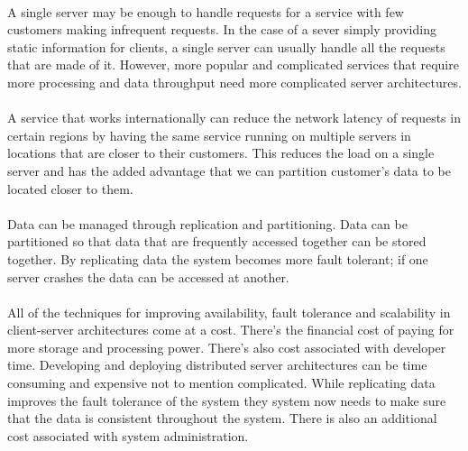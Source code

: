 \documentclass[11pt]{amsart}
\begin{document}
\paragraph{}
A single server may be enough to handle requests for a service with few customers making infrequent requests. In the case of a sever simply providing static information for clients, a single server can usually handle all the requests that are made of it. However, more popular and complicated services that require more processing and data throughput need more complicated server architectures.

\paragraph{}
 A service that works internationally can reduce the network latency of requests in certain regions by having the same service running on multiple servers in locations that are closer to their customers. This reduces the load on a single server and has the added advantage that we can partition customer's data to be located closer to them.

\paragraph{}
Data can be managed through replication and partitioning. Data can be partitioned so that data that are frequently accessed together can be stored together. By replicating data the system becomes more fault tolerant; if one server crashes the data can be accessed at another.

\paragraph{}
All of the techniques for improving availability, fault tolerance and scalability in client-server architectures come at a cost. There's the financial cost of paying for more storage and processing power. There's also cost associated with developer time. Developing and deploying distributed server architectures can be time consuming and expensive not to mention complicated. While replicating data improves the fault tolerance of the system they system now needs to make sure that the data is consistent throughout the system. There is also an additional cost associated with system administration.\cite{DistSys}

\paragraph{}
\end{document}
